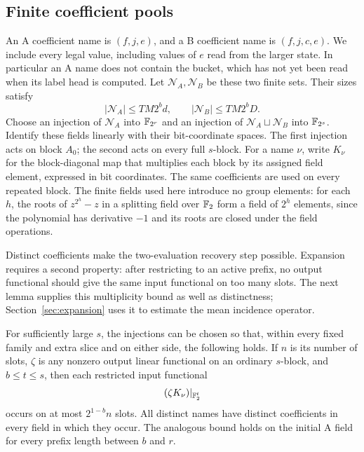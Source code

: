 \subsection{Finite coefficient pools}

An A coefficient name is $(f,j,e)$, and a B coefficient name is
$(f,j,c,e)$.  We include every legal value, including values of $e$ read
from the larger state.  In particular an A name does not contain the
bucket, which has not yet been read when its label head is computed.
Let $\mathcal N_A,\mathcal N_B$ be these two finite sets.  Their sizes
satisfy
\begin{equation}\label{eq:name-count}
 |\mathcal N_A|\le TM2^b d,\qquad
 |\mathcal N_B|\le TM2^bD.
\end{equation}
Choose an injection of $\mathcal N_A$ into $\mathbb F_{2^r}$ and an injection of
$\mathcal N_A\sqcup\mathcal N_B$ into $\mathbb F_{2^s}$.  Identify these fields
linearly with their bit-coordinate spaces.  The first injection acts on
block $A_0$; the second acts on every full $s$-block.  For a name $\nu$,
write $K_\nu$ for the block-diagonal map that multiplies each block by
its assigned field element, expressed in bit coordinates.
The same coefficients are used on every repeated block.
The finite fields used here introduce no group elements: for each $h$,
the roots of $z^{2^h}-z$ in a splitting field over $\mathbb F_2$ form a field
of $2^h$ elements, since the polynomial has derivative $-1$ and its
roots are closed under the field operations.

Distinct coefficients make the two-evaluation recovery step possible.
Expansion requires a second property: after restricting to an active
prefix, no output functional should give the same input functional on
too many slots.  The next lemma supplies this multiplicity bound as well
as distinctness; Section~\ref{sec:expansion} uses it to estimate the mean
incidence operator.

\begin{lemma}\label{lem:coefficient-pools}
For sufficiently large $s$, the injections can be chosen so that, within
every fixed family and extra slice and on either side, the following
holds.  If $n$ is its number of slots, $\zeta$ is any nonzero output
linear functional on an ordinary $s$-block, and $b\le t\le s$, then each
restricted input functional
\[
  (\zeta K_\nu)|_{\mathbb F_2^t}
\]
occurs on at most $2^{1-b}n$ slots.  All distinct names have distinct
coefficients in every field in which they occur.
The analogous bound holds on the initial A field for every prefix
length between $b$ and $r$.
\end{lemma}

